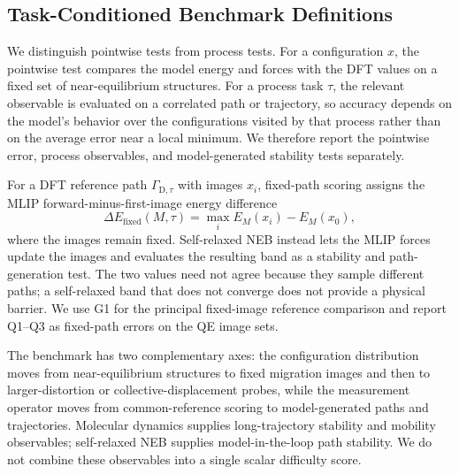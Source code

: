 \documentclass[pdflatex,sn-mathphys-num]{sn-jnl}%
\theoremstyle{thmstyleone}%
\theoremstyle{thmstyletwo}%
\theoremstyle{thmstylethree}%
\begin{document}




\subsection{Task-Conditioned Benchmark Definitions}
\label{sec:si_benchmark_definitions}

We distinguish pointwise tests from process tests. For a configuration $x$, the pointwise test compares the model energy and forces with the DFT values on a fixed set of near-equilibrium structures. For a process task $\tau$, the relevant observable is evaluated on a correlated path or trajectory, so accuracy depends on the model's behavior over the configurations visited by that process rather than on the average error near a local minimum. We therefore report the pointwise error, process observables, and model-generated stability tests separately.

For a DFT reference path $\Gamma_{\mathrm{D},\tau}$ with images $x_i$, fixed-path scoring assigns the MLIP forward-minus-first-image energy difference
\begin{equation}
\Delta E_{\mathrm{fixed}}(M,\tau)=\max_i E_M(x_i)-E_M(x_0),
\end{equation}
where the images remain fixed. Self-relaxed NEB instead lets the MLIP forces update the images and evaluates the resulting band as a stability and path-generation test. The two values need not agree because they sample different paths; a self-relaxed band that does not converge does not provide a physical barrier. We use G1 for the principal fixed-image reference comparison and report Q1--Q3 as fixed-path errors on the QE image sets.

The benchmark has two complementary axes: the configuration distribution moves from near-equilibrium structures to fixed migration images and then to larger-distortion or collective-displacement probes, while the measurement operator moves from common-reference scoring to model-generated paths and trajectories. Molecular dynamics supplies long-trajectory stability and mobility observables; self-relaxed NEB supplies model-in-the-loop path stability. We do not combine these observables into a single scalar difficulty score.
\end{document}
